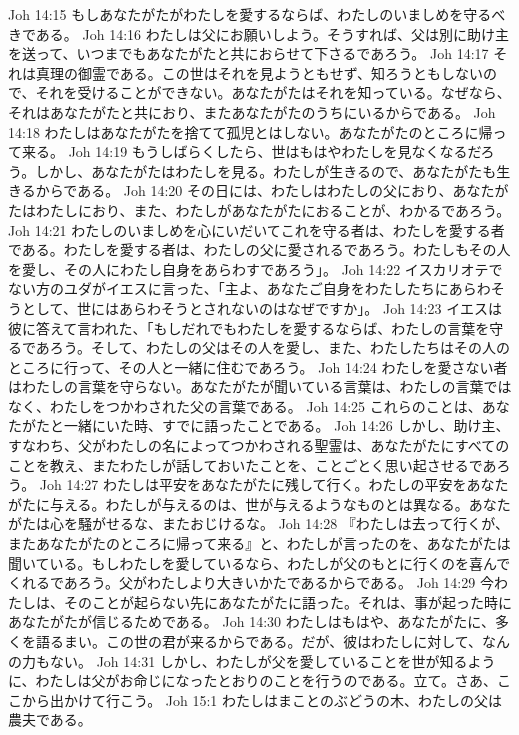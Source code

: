 Joh 14:15  もしあなたがたがわたしを愛するならば、わたしのいましめを守るべきである。
Joh 14:16  わたしは父にお願いしよう。そうすれば、父は別に助け主を送って、いつまでもあなたがたと共におらせて下さるであろう。
Joh 14:17  それは真理の御霊である。この世はそれを見ようともせず、知ろうともしないので、それを受けることができない。あなたがたはそれを知っている。なぜなら、それはあなたがたと共におり、またあなたがたのうちにいるからである。
Joh 14:18  わたしはあなたがたを捨てて孤児とはしない。あなたがたのところに帰って来る。
Joh 14:19  もうしばらくしたら、世はもはやわたしを見なくなるだろう。しかし、あなたがたはわたしを見る。わたしが生きるので、あなたがたも生きるからである。
Joh 14:20  その日には、わたしはわたしの父におり、あなたがたはわたしにおり、また、わたしがあなたがたにおることが、わかるであろう。
Joh 14:21  わたしのいましめを心にいだいてこれを守る者は、わたしを愛する者である。わたしを愛する者は、わたしの父に愛されるであろう。わたしもその人を愛し、その人にわたし自身をあらわすであろう」。
Joh 14:22  イスカリオテでない方のユダがイエスに言った、「主よ、あなたご自身をわたしたちにあらわそうとして、世にはあらわそうとされないのはなぜですか」。
Joh 14:23  イエスは彼に答えて言われた、「もしだれでもわたしを愛するならば、わたしの言葉を守るであろう。そして、わたしの父はその人を愛し、また、わたしたちはその人のところに行って、その人と一緒に住むであろう。
Joh 14:24  わたしを愛さない者はわたしの言葉を守らない。あなたがたが聞いている言葉は、わたしの言葉ではなく、わたしをつかわされた父の言葉である。
Joh 14:25  これらのことは、あなたがたと一緒にいた時、すでに語ったことである。
Joh 14:26  しかし、助け主、すなわち、父がわたしの名によってつかわされる聖霊は、あなたがたにすべてのことを教え、またわたしが話しておいたことを、ことごとく思い起させるであろう。
Joh 14:27  わたしは平安をあなたがたに残して行く。わたしの平安をあなたがたに与える。わたしが与えるのは、世が与えるようなものとは異なる。あなたがたは心を騒がせるな、またおじけるな。
Joh 14:28  『わたしは去って行くが、またあなたがたのところに帰って来る』と、わたしが言ったのを、あなたがたは聞いている。もしわたしを愛しているなら、わたしが父のもとに行くのを喜んでくれるであろう。父がわたしより大きいかたであるからである。
Joh 14:29  今わたしは、そのことが起らない先にあなたがたに語った。それは、事が起った時にあなたがたが信じるためである。
Joh 14:30  わたしはもはや、あなたがたに、多くを語るまい。この世の君が来るからである。だが、彼はわたしに対して、なんの力もない。
Joh 14:31  しかし、わたしが父を愛していることを世が知るように、わたしは父がお命じになったとおりのことを行うのである。立て。さあ、ここから出かけて行こう。
Joh 15:1  わたしはまことのぶどうの木、わたしの父は農夫である。
